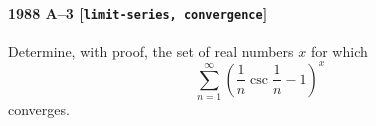 \paragraph{1988 A--3 \textnormal{[\texttt{limit-series, convergence}]}}
Determine, with proof, the set of real numbers $x$ for which
\[
\sum_{n=1}^\infty \left( \frac{1}{n} \csc \frac{1}{n} - 1 \right)^x
\]
converges.
